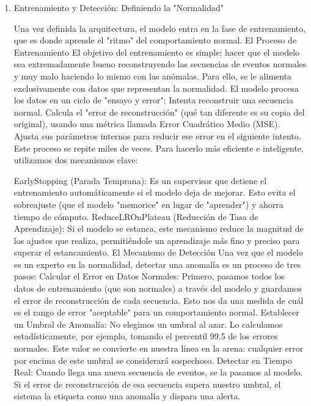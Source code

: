 \begin{enumerate}
\begin{enumerate}
          \item Entrenamiento y Detección: Definiendo la "Normalidad"

                Una vez definida la arquitectura, el modelo entra en la fase de entrenamiento, que es donde aprende el "ritmo" del comportamiento normal.
                El Proceso de Entrenamiento
                El objetivo del entrenamiento es simple: hacer que el modelo sea extremadamente bueno reconstruyendo las secuencias de eventos normales y muy malo haciendo lo mismo con las anómalas. Para ello, se le alimenta exclusivamente con datos que representan la normalidad.
                El modelo procesa los datos en un ciclo de "ensayo y error":
                Intenta reconstruir una secuencia normal.
                Calcula el "error de reconstrucción" (qué tan diferente es su copia del original), usando una métrica llamada Error Cuadrático Medio (MSE).
                Ajusta sus parámetros internos para reducir ese error en el siguiente intento.
                Este proceso se repite miles de veces. Para hacerlo más eficiente e inteligente, utilizamos dos mecanismos clave:

                EarlyStopping (Parada Temprana): Es un supervisor que detiene el entrenamiento automáticamente si el modelo deja de mejorar. Esto evita el sobreajuste (que el modelo "memorice" en lugar de "aprender") y ahorra tiempo de cómputo.
                ReduceLROnPlateau (Reducción de Tasa de Aprendizaje): Si el modelo se estanca, este mecanismo reduce la magnitud de los ajustes que realiza, permitiéndole un aprendizaje más fino y preciso para superar el estancamiento.
                El Mecanismo de Detección
                Una vez que el modelo es un experto en la normalidad, detectar una anomalía es un proceso de tres pasos:
                Calcular el Error en Datos Normales: Primero, pasamos todos los datos de entrenamiento (que son normales) a través del modelo y guardamos el error de reconstrucción de cada secuencia. Esto nos da una medida de cuál es el rango de error "aceptable" para un comportamiento normal.
                Establecer un Umbral de Anomalía: No elegimos un umbral al azar. Lo calculamos estadísticamente, por ejemplo, tomando el percentil 99.5 de los errores normales. Este valor se convierte en nuestra línea en la arena: cualquier error por encima de este umbral se considerará sospechoso.
                Detectar en Tiempo Real: Cuando llega una nueva secuencia de eventos, se la pasamos al modelo. Si el error de reconstrucción de esa secuencia supera nuestro umbral, el sistema la etiqueta como una anomalía y dispara una alerta.
        \end{enumerate}
\end{enumerate}

